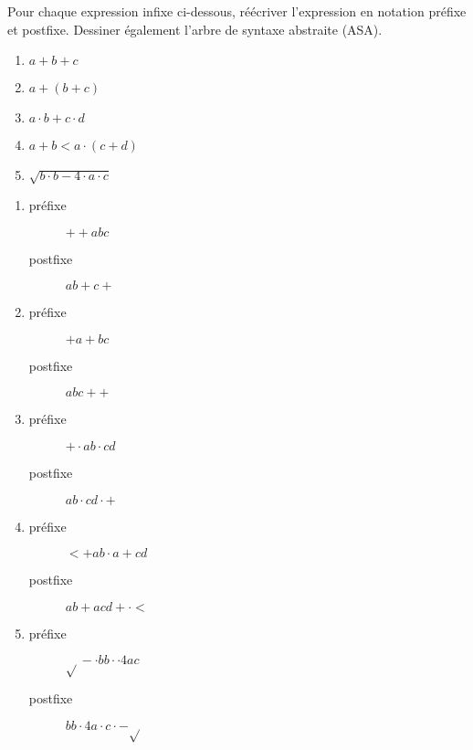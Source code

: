 \begin{Exercise}[title={Conversion préfixe, infixe, postfixe}]
  \label{ex:infixe-prefixe-postfixe}
Pour chaque expression infixe ci-dessous, réécriver l'expression en
notation préfixe et postfixe. Dessiner également l'arbre de syntaxe
abstraite (ASA).

\begin{enumerate}
\item $a + b + c$
\item $a + (b + c)$
\item $a \cdot b + c \cdot d$
\item $a + b < a \cdot (c + d)$
\item $\sqrt{b \cdot b - 4 \cdot a \cdot c}$
\end{enumerate}
\end{Exercise}

\begin{Answer}[ref={ex:infixe-prefixe-postfixe}]
\begin{enumerate}
\item \begin{description}
  \item[préfixe]$+ + a b c$
  \item[postfixe]$a b + c +$
    \end{description}
\item \begin{description}
  \item[préfixe]$+ a + b c$
  \item[postfixe]$a b c + +$
    \end{description}
\item \begin{description}
  \item[préfixe]$+ \cdot a b \cdot c d$
  \item[postfixe]$a b \cdot c d \cdot +$
    \end{description}
\item \begin{description}
  \item[préfixe]$< + a b \cdot a + c d$
  \item[postfixe]$a b + a c d + \cdot <$
    \end{description}
\item \begin{description}
  \item[préfixe]$\sqrt{} - \cdot b b \cdot \cdot 4 a c$
  \item[postfixe]$b b \cdot 4 a \cdot c \cdot - \sqrt{}$
    \end{description}
\end{enumerate}
\end{Answer}
